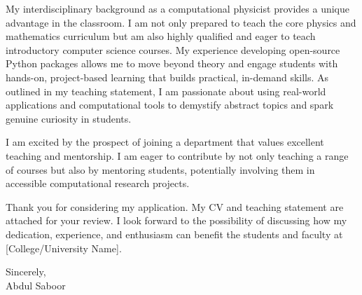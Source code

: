 \documentclass[letter,11pt]{article}
\begin{document}
My interdisciplinary background as a computational physicist provides a unique advantage in the classroom. I am not only prepared to teach the core physics and mathematics curriculum but am also highly qualified and eager to teach introductory computer science courses. My experience developing open-source Python packages allows me to move beyond theory and engage students with hands-on, project-based learning that builds practical, in-demand skills. As outlined in my teaching statement, I am passionate about using real-world applications and computational tools to demystify abstract topics and spark genuine curiosity in students.

I am excited by the prospect of joining a department that values excellent teaching and mentorship. I am eager to contribute by not only teaching a range of courses but also by mentoring students, potentially involving them in accessible computational research projects.

Thank you for considering my application. My CV and teaching statement are attached for your review. I look forward to the possibility of discussing how my dedication, experience, and enthusiasm can benefit the students and faculty at [College/University Name].

\vspace{5mm}

\noindent
Sincerely, \\
\vspace{1cm}
\noindent
Abdul Saboor
\end{document}
